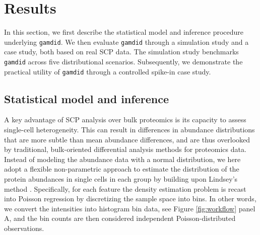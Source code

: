 \section{Results} \label{results}

In this section, we first describe the statistical model and inference procedure underlying \texttt{gamdid}. We then evaluate \texttt{gamdid} through a simulation study and a case study, both based on real SCP data. The simulation study benchmarks \texttt{gamdid} across five distributional scenarios. Subsequently, we demonstrate the practical utility of \texttt{gamdid} through a controlled spike-in case study.

\subsection{Statistical model and inference}
A key advantage of SCP analysis over bulk proteomics is its capacity to assess single-cell heterogeneity. This can result in differences in abundance distributions that are more subtle than mean abundance differences, and are thus overlooked by traditional, bulk-oriented differential analysis methods for proteomics data.\\
Instead of modeling the abundance data with a normal distribution, we here adopt a flexible non-parametric approach to estimate the distribution of the protein abundances in single cells in each group by building upon Lindsey's method \cite{lindsay_method}. Specifically, for each feature the density estimation problem is recast into Poisson regression by discretizing the sample space into bins. In other words, we convert the intensities into histogram bin data, see Figure \ref{fig:workflow} panel A, and the bin counts are then considered independent Poisson-distributed observations.

